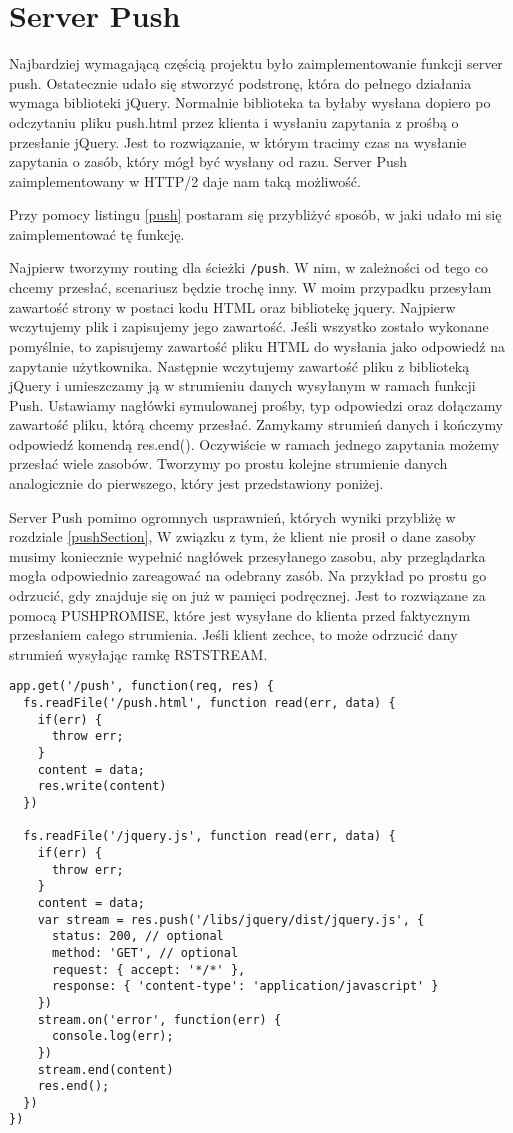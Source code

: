 \documentclass[a4paper,12pt,twoside,openany]{report}
\begin{document}
\section{Server Push}

Najbardziej wymagającą częścią projektu było zaimplementowanie funkcji server push.
Ostatecznie udało się stworzyć podstronę, która do pełnego działania wymaga biblioteki jQuery.
Normalnie biblioteka ta byłaby wysłana dopiero po odczytaniu pliku push.html przez klienta i wysłaniu zapytania z prośbą o przesłanie jQuery.
Jest to rozwiązanie, w którym tracimy czas na wysłanie zapytania o zasób, który mógł być wysłany od razu.
Server Push zaimplementowany w HTTP/2 daje nam taką możliwość.

Przy pomocy listingu \ref{push} postaram się przybliżyć sposób, w jaki udało mi się zaimplementować tę funkcję.

Najpierw tworzymy routing dla ścieżki \texttt{/push}.
W nim, w zależności od tego co chcemy przesłać, scenariusz będzie trochę inny.
W moim przypadku przesyłam zawartość strony w postaci kodu HTML oraz bibliotekę jquery.
Najpierw wczytujemy plik i zapisujemy jego zawartość.
Jeśli wszystko zostało wykonane pomyślnie, to zapisujemy zawartość pliku HTML do wysłania jako odpowiedź na zapytanie użytkownika.
Następnie wczytujemy zawartość pliku z biblioteką jQuery i umieszczamy ją w strumieniu danych wysyłanym w ramach funkcji Push.
Ustawiamy nagłówki symulowanej prośby, typ odpowiedzi oraz dołączamy zawartość pliku, którą chcemy przesłać.
Zamykamy strumień danych i kończymy odpowiedź komendą res.end().
Oczywiście w ramach jednego zapytania możemy przesłać wiele zasobów.
Tworzymy po prostu kolejne strumienie danych analogicznie do pierwszego, który jest przedstawiony poniżej.

Server Push pomimo ogromnych usprawnień, których wyniki przybliżę w rozdziale \ref{pushSection},
W związku z tym, że klient nie prosił o dane zasoby musimy koniecznie wypełnić nagłówek przesyłanego zasobu, aby przeglądarka mogła odpowiednio zareagować na odebrany zasób.
Na przykład po prostu go odrzucić, gdy znajduje się on już w pamięci podręcznej.
Jest to rozwiązane za pomocą PUSH\textunderscore PROMISE, które jest wysyłane do klienta przed faktycznym przesłaniem całego strumienia.
Jeśli klient zechce, to może odrzucić dany strumień wysyłając ramkę RST\textunderscore STREAM.

\begin{lstlisting}[caption=Konfiguracja server push, label=push]
app.get('/push', function(req, res) {
  fs.readFile('/push.html', function read(err, data) {
    if(err) {
      throw err;
    }
    content = data;
    res.write(content)
  })

  fs.readFile('/jquery.js', function read(err, data) {
    if(err) {
      throw err;
    }
    content = data;
    var stream = res.push('/libs/jquery/dist/jquery.js', {
      status: 200, // optional
      method: 'GET', // optional
      request: { accept: '*/*' },
      response: { 'content-type': 'application/javascript' }
    })
    stream.on('error', function(err) {
      console.log(err);
    })
    stream.end(content)
    res.end();
  })
})
\end{lstlisting}
\end{document}
